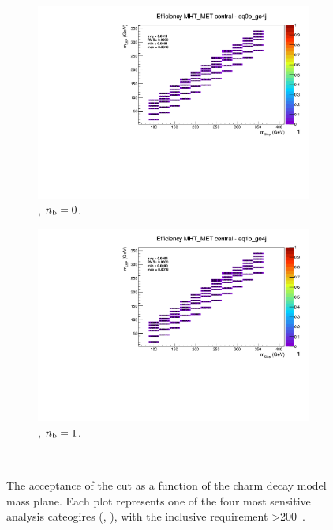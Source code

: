 \begin{figure}[h!]
\begin{subfigure}[b]{0.4\textwidth}
    \includegraphics[width=\textwidth, page=6]{Figs/sms/t2cc/v37_3/systs/T2cc_MHT_MET_eq0b_ge4j.pdf}
    \caption{\njhigh, $n_{\text{b}} = 0$.}
  \end{subfigure}
  \begin{subfigure}[b]{0.4\textwidth}
    \includegraphics[width=\textwidth, page=6]{Figs/sms/t2cc/v37_3/systs/T2cc_MHT_MET_eq1b_ge4j.pdf}
    \caption{\njhigh, $n_{\text{b}} = 1$.}
  \end{subfigure}\\
  \caption{The acceptance of the \mhtmet cut as a function of the charm decay
  model
  mass plane. Each plot represents one of the four most sensitive 
  analysis cateogires (\nb, \nj), with the inclusive requirement \HT>200~\gev.}
  \label{fig:sms-mhtmet-t2cc}
\end{figure}


